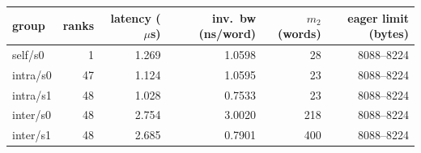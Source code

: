 \begin{tabular}{lrrrrr}
\toprule
group & ranks & latency ($\mu$s) & inv.\ bw (ns/word) & $m_2$ (words) & eager limit (bytes) \\
\midrule
self/s0 & 1 & 1.269 & 1.0598 & 28 & 8088--8224 \\
intra/s0 & 47 & 1.124 & 1.0595 & 23 & 8088--8224 \\
intra/s1 & 48 & 1.028 & 0.7533 & 23 & 8088--8224 \\
inter/s0 & 48 & 2.754 & 3.0020 & 218 & 8088--8224 \\
inter/s1 & 48 & 2.685 & 0.7901 & 400 & 8088--8224 \\
\bottomrule
\end{tabular}
